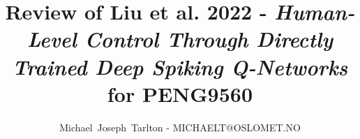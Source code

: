 \documentclass[journal,onecolumn]{IEEEtran}
\begin{document}
%
\title{Review of Liu et al. 2022 - \textit{Human-Level Control Through Directly Trained Deep Spiking Q-Networks} for PENG9560}
%
%
%

\author{Michael~Joseph~Tarlton - MICHAELT@OSLOMET.NO}%


% 
%
\end{document}
